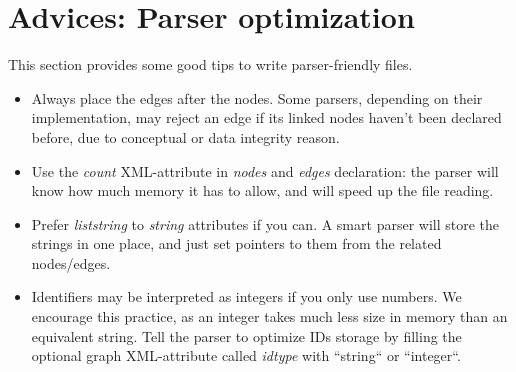 \documentclass[a4paper,10pt]{article}
\begin{document}
\section{Advices: Parser optimization} \label{advices}

This section provides some good tips to write parser-friendly files.
\begin{itemize}
 \item Always place the edges after the nodes. Some parsers, depending on their implementation, may reject an edge if its linked nodes haven't been declared before, due to conceptual or data integrity reason.
 \item Use the \textit{count} XML-attribute in \textit{nodes} and \textit{edges} declaration: the parser will know how much memory it has to allow, and will speed up the file reading.
 \item Prefer \textit{liststring} to \textit{string} attributes if you can. A smart parser will store the strings in one place, and just set pointers to them from the related nodes/edges.
 \item Identifiers may be interpreted as integers if you only use numbers. We encourage this practice, as an integer takes much less size in memory than an equivalent string. Tell the parser to optimize IDs storage by filling the optional graph XML-attribute called \textit{idtype} with “string“ or “integer“.
\end{itemize}


\printindex
\end{document}
